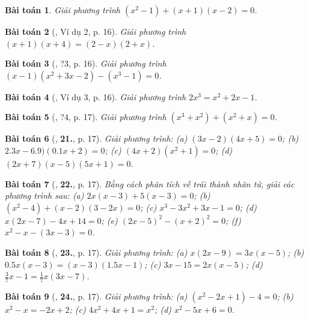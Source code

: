 \documentclass{article}
\numberwithin{equation}{section}
\newtheorem{baitoan}{Bài toán}
\begin{document}
\begin{baitoan}
	Giải phương trình $(x^2 - 1) + (x + 1)(x - 2) = 0$.
\end{baitoan}

\begin{baitoan}[\cite{SGK_Toan_8_tap_2}, Ví dụ 2, p. 16]
	Giải phương trình $(x + 1)(x + 4) = (2 - x)(2 + x)$.
\end{baitoan}

\begin{baitoan}[\cite{SGK_Toan_8_tap_2}, ?3, p. 16]
	Giải phương trình $(x - 1)(x^2 + 3x - 2) - (x^3 - 1) = 0$.
\end{baitoan}

\begin{baitoan}[\cite{SGK_Toan_8_tap_2}, Ví dụ 3, p. 16]
	Giải phương trình $2x^3 = x^2 + 2x - 1$.
\end{baitoan}

\begin{baitoan}[\cite{SGK_Toan_8_tap_2}, ?4, p. 17]
	Giải phương trình $(x^3 + x^2) + (x^2 + x) = 0$.
\end{baitoan}

\begin{baitoan}[\cite{SGK_Toan_8_tap_2}, \textbf{21.}, p. 17]
	Giải phương trình: (a) $(3x - 2)(4x + 5) = 0$; (b) $2.3x - 6.9)(0.1x + 2) = 0$; (c) $(4x + 2)(x^2 + 1) = 0$; (d) $(2x + 7)(x - 5)(5x + 1) = 0$.
\end{baitoan}

\begin{baitoan}[\cite{SGK_Toan_8_tap_2}, \textbf{22.}, p. 17]
	Bằng cách phân tích vế trái thành nhân tử, giải các phương trình sau: (a) $2x(x - 3) + 5(x - 3) = 0$; (b) $(x^2 - 4) + (x - 2)(3 - 2x) = 0$; (c) $x^3 - 3x^2 + 3x - 1 = 0$; (d) $x(2x - 7) - 4x + 14 = 0$; (e) $(2x - 5)^2 - (x + 2)^2 = 0$; (f) $x^2 - x - (3x - 3) = 0$.
\end{baitoan}

\begin{baitoan}[\cite{SGK_Toan_8_tap_2}, \textbf{23.}, p. 17]
	Giải phương trình: (a) $x(2x - 9) = 3x(x - 5)$; (b) $0.5x(x - 3) = (x - 3)(1.5x - 1)$; (c) $3x - 15 = 2x(x - 5)$; (d) $\frac{3}{7}x - 1 = \frac{1}{7}x(3x - 7)$.
\end{baitoan}

\begin{baitoan}[\cite{SGK_Toan_8_tap_2}, \textbf{24.}, p. 17]
	Giải phương trình: (a) $(x^2 - 2x + 1) - 4 = 0$; (b) $x^2 - x = -2x + 2$; (c) $4x^2 + 4x + 1 = x^2$; (d) $x^2 - 5x + 6 = 0$.
\end{baitoan}
\end{document}
